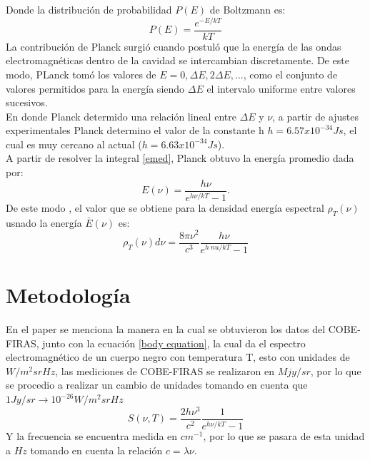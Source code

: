 \documentclass[12pt,letterpaper]{article}
\begin{document}
\begin{multicols}{2}
Donde la distribución de probabilidad $P(E)$ de Boltzmann es:
\begin{equation}
P(E)=\frac{e^{-E/kT}}{kT}
\end{equation}
La contribución de Planck surgió cuando postuló que la energía de las ondas electromagnéticas dentro de la cavidad se intercambian discretamente. De este modo, PLanck tomó los valores de $E=0,\Delta E,2\Delta E,...$,
como el conjunto de valores permitidos para la energía siendo $\Delta E$ el intervalo uniforme entre valores sucesivos.\\
En donde Planck determido una relación lineal entre $\Delta E$ y $\nu$, a partir de ajustes experimentales Planck determino el valor de la constante h $h=6.57x10^{-34} Js$, el cual es muy cercano al actual ($h=6.63x10^{-34} Js$). \\
A partir de resolver la integral \ref{emed}, Planck obtuvo la energía promedio dada por:
\begin{equation}
E(\nu) = \frac{h\nu}{e^{h\nu/kT}-1}.
\end{equation}
De este modo , el valor que se obtiene para la densidad energía espectral $\rho_T(\nu)$ usnado la energía $\bar{E}(\nu)$ es:
\begin{equation}
\rho_T(\nu) d\nu = \frac{8\pi \nu^2}{c^3} \frac{h \nu }{e^{h\ nu /kT}-1}
\end{equation}
\section*{Metodología}
En el paper \cite{Eccarelli1996} se menciona la manera en la cual se obtuvieron los datos del COBE-FIRAS, junto con la ecuación \ref{body equation}, la cual da el espectro electromagnético de un cuerpo negro con temperatura T, esto con unidades de  $W/m^2srHz$, las mediciones de COBE-FIRAS se realizaron en $Mjy/sr$, por lo que se procedio a realizar un cambio de unidades tomando en cuenta que $1 Jy /sr \rightarrow 10^{-26} W/m^2 srHz $
\begin{equation}
S(\nu,T)= \frac{2h\nu^3}{c^2} \frac{1}{e^{h\nu/kT}-1}
\label{body equation}
\end{equation}
Y la frecuencia se encuentra medida en $cm^{-1}$, por lo que se pasara de esta unidad a $Hz$ tomando en cuenta la relación $c=\lambda \nu $.

\end{multicols}
\end{document}
